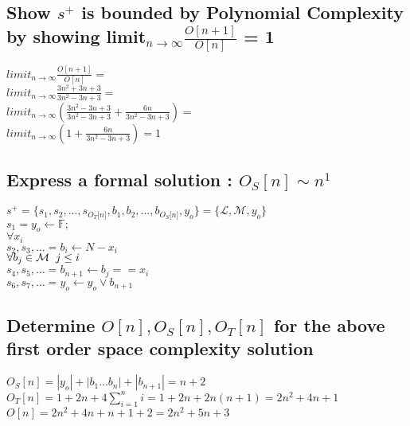 \documentclass[11pt]{article}
\begin{document}
\subsection{Show $s^+$ is bounded by Polynomial Complexity by showing limit$_{n \rightarrow \infty}\frac{O[n+1]}{O[n]}$ = 1}
\begin{center}
$
limit_{n \rightarrow \infty}\frac{O[n+1]}{O[n]} =
$
\\ \vspace{2mm}
$
limit_{n \rightarrow \infty}\frac{3n^2 + 3n + 3}{3n^2 - 3n + 3} =
$
\\ \vspace{2mm}
$
limit_{n \rightarrow \infty}(\frac{3n^2 - 3n + 3}{3n^2 - 3n + 3} + \frac{6n }{3n^2 - 3n + 3}) =
$
\\ \vspace{2mm}
$
limit_{n \rightarrow \infty}(1 + \frac{6n }{3n^2 - 3n + 3}) = 1
$
\end{center}




\subsection{Express a formal solution : $O_S[n] \sim n^1$}
\begin{center}
$
s^+ = \{ s_1,s_2,...,s_{O_T \lbrack n \rbrack }, b_1, b_2,...,b_{O_S \lbrack n \rbrack},y_o \} = \{ \mathcal{L},\mathcal{M},y_o\}
$
\\ \vspace{2mm}
$
s_1 = y_o \leftarrow \mathbb{F};
$
\\ \vspace{2mm}
$
\forall x_i
$
\\ \vspace{2mm}
$
s_2,s_3,... = b_i \leftarrow N - x_i
$
\\ \vspace{2mm}
$
\forall b_j \in \mathcal{M} \hspace{2mm} j \leq i
$
\\ \vspace{2mm}
$
s_4,s_5,... = b_{n+1} \leftarrow b_j == x_i
$
\\ \vspace{2mm}
$
s_6,s_7,... = y_o \leftarrow y_o \lor b_{n+1}
$
\end{center}








\subsection{Determine $O[n], O_S[n], O_T[n]$ for the above first order space complexity solution}
\begin{center}
$
O_S[n] = |y_o| + |b_1...b_n| + |b_{n+1}| = n + 2
$
\\ \vspace{2mm}
$
O_T[n] = 1 + 2n + 4\sum_{i=1}^n i = 1 + 2n + 2n(n+1) = 2n^2 + 4n + 1 
$
\\ \vspace{2mm}
$
O[n] = 2n^2 + 4n + n + 1 + 2 = 2n^2 + 5n + 3
$
\end{center}
\end{document}
